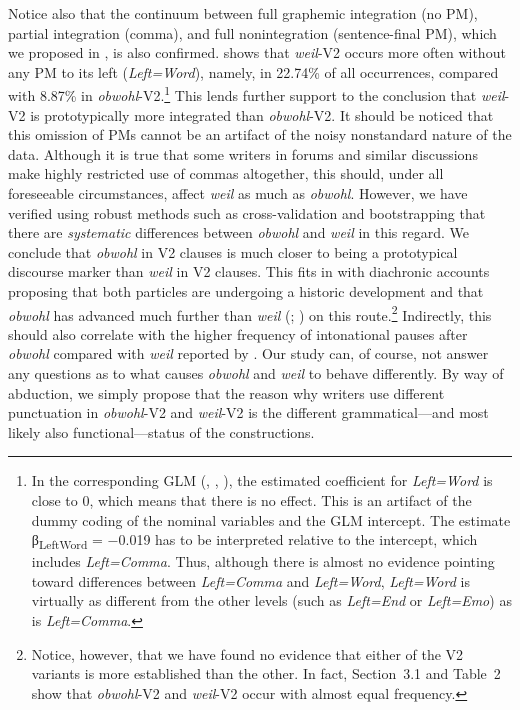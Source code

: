 \begin{styleMoutonText}
Notice also that the continuum between full graphemic integration (no PM), partial integration (comma), and full nonintegration (sentence-final PM), which we proposed in , is also confirmed.  shows that \textit{weil}{}-V2 occurs more often without any PM to its left (\textit{Left=Word}), namely, in 22.74\% of all occurrences, compared with 8.87\% in \textit{obwohl}{}-V2.\footnote{In the corresponding GLM (, , ), the estimated coefficient for \textit{Left=Word} is close to 0, which means that there is no effect. This is an artifact of the dummy coding of the nominal variables and the GLM intercept. The estimate β\textsubscript{LeftWord} = $-$0.019 has to be interpreted relative to the intercept, which includes \textit{Left=Comma}. Thus, although there is almost no evidence pointing toward differences between \textit{Left=Comma} and \textit{Left=Word}, \textit{Left=Word} is virtually as different from the other levels (such as \textit{Left=End} or \textit{Left=Emo}) as is \textit{Left=Comma}.} This lends further support to the conclusion that \textit{weil}{}-V2 is prototypically more integrated than \textit{obwohl}{}-V2. It should be noticed that this omission of PMs cannot be an artifact of the noisy nonstandard nature of the data. Although it is true that some writers in forums and similar discussions make highly restricted use of commas altogether, this should, under all foreseeable circumstances, affect \textit{weil} as much as \textit{obwohl}. However, we have verified using robust methods such as cross-validation and bootstrapping that there are \textit{systematic} differences between \textit{obwohl} and \textit{weil} in this regard. We conclude that \textit{obwohl} in V2 clauses is much closer to being a prototypical discourse marker than \textit{weil} in V2 clauses. This fits in with diachronic accounts proposing that both particles are undergoing a historic development and that \textit{obwohl} has advanced much further than \textit{weil} (\citealt{GohlGünthner1999}; \citealt{Günthner2003}) on this route.\footnote{Notice, however, that we have found no evidence that either of the V2 variants is more established than the other. In fact, Section~3.1 and Table~2 show that \textit{obwohl}{}-V2 and \textit{weil}{}-V2 occur with almost equal frequency.} Indirectly, this should also correlate with the higher frequency of intonational pauses after \textit{obwohl} compared with \textit{weil} reported by \citet{Breindl2009}. Our study can, of course, not answer any questions as to what causes \textit{obwohl} and \textit{weil} to behave differently. By way of abduction, we simply propose that the reason why writers use different punctuation in \textit{obwohl}{}-V2 and \textit{weil}{}-V2 is the different grammatical—and most likely also functional—status of the constructions.
\end{styleMoutonText}

